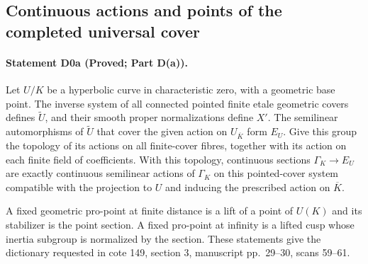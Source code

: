 \subsection{Continuous actions and points of the completed universal cover}
\paragraph{Statement D0a (Proved; Part D(a)).}\label{res:D0a}
Let $U/K$ be a hyperbolic curve in characteristic zero, with a geometric base point. The inverse system of all connected pointed finite etale geometric covers defines $\widetilde U$, and their smooth proper normalizations define $X'$. The semilinear automorphisms of $\widetilde U$ that cover the given action on $U_{\overline K}$ form $E_U$. Give this group the topology of its actions on all finite-cover fibres, together with its action on each finite field of coefficients. With this topology, continuous sections $\Gamma_K\to E_U$ are exactly continuous semilinear actions of $\Gamma_K$ on this pointed-cover system compatible with the projection to $U$ and inducing the prescribed action on $\overline K$.

A fixed geometric pro-point at finite distance is a lift of a point of $U(K)$ and its stabilizer is the point section. A fixed pro-point at infinity is a lifted cusp whose inertia subgroup is normalized by the section. These statements give the dictionary requested in cote 149, section 3, manuscript pp.~29--30, scans 59--61.

